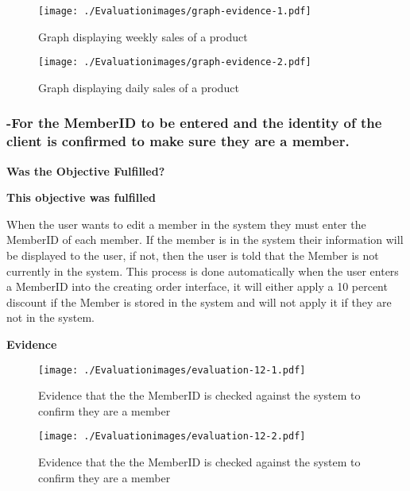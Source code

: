 \begin{figure}[H]
\caption{Graph displaying weekly sales of a product} \label{fig:graph-evidence-1.pdf}
\hfill\texttt{[image: ./Evaluationimages/graph-evidence-1.pdf]}
\end{figure}

\begin{figure}[H]
\caption{Graph displaying daily sales of a product} \label{fig:graph-evidence-2.pdf}
\hfill\texttt{[image: ./Evaluationimages/graph-evidence-2.pdf]}
\end{figure}




\pagebreak
\subsubsection{-For the MemberID to be entered and the identity of the client is confirmed to make sure they are a member.}

\textbf{Was the Objective Fulfilled?} \newline

\textbf{\large{This objective was fulfilled}}

When the user wants to edit a member in the system they must enter the MemberID of each member. If the member is in the system their information will be displayed to the user, if not, then the user is told that the Member is not currently in the system. This process is done automatically when the user enters a MemberID into the creating order interface, it will either apply a 10 percent discount if the Member is stored in the system and will not apply it if they are not in the system.

\pagebreak

\textbf{Evidence} \newline

\begin{figure}[H]
\caption{Evidence that the the MemberID is checked against the system to confirm they are a member} \label{fig:evaluation-12-1}
\hfill\texttt{[image: ./Evaluationimages/evaluation-12-1.pdf]}
\end{figure}

\begin{figure}[H]
\caption{Evidence that the the MemberID is checked against the system to confirm they are a member} \label{fig:evaluation-12-2}
\hfill\texttt{[image: ./Evaluationimages/evaluation-12-2.pdf]}
\end{figure}






